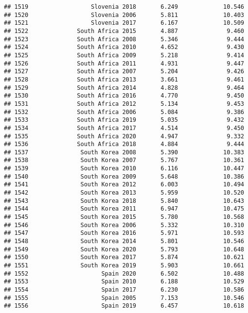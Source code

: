 \documentclass[
]{article}
\begin{document}
\begin{verbatim}
## 1519                  Slovenia 2018       6.249             10.546
## 1520                  Slovenia 2006       5.811             10.403
## 1521                  Slovenia 2017       6.167             10.509
## 1522              South Africa 2015       4.887              9.460
## 1523              South Africa 2008       5.346              9.444
## 1524              South Africa 2010       4.652              9.430
## 1525              South Africa 2009       5.218              9.414
## 1526              South Africa 2011       4.931              9.447
## 1527              South Africa 2007       5.204              9.426
## 1528              South Africa 2013       3.661              9.461
## 1529              South Africa 2014       4.828              9.464
## 1530              South Africa 2016       4.770              9.450
## 1531              South Africa 2012       5.134              9.453
## 1532              South Africa 2006       5.084              9.386
## 1533              South Africa 2019       5.035              9.432
## 1534              South Africa 2017       4.514              9.450
## 1535              South Africa 2020       4.947              9.332
## 1536              South Africa 2018       4.884              9.444
## 1537               South Korea 2008       5.390             10.383
## 1538               South Korea 2007       5.767             10.361
## 1539               South Korea 2010       6.116             10.447
## 1540               South Korea 2009       5.648             10.386
## 1541               South Korea 2012       6.003             10.494
## 1542               South Korea 2013       5.959             10.520
## 1543               South Korea 2018       5.840             10.643
## 1544               South Korea 2011       6.947             10.475
## 1545               South Korea 2015       5.780             10.568
## 1546               South Korea 2006       5.332             10.310
## 1547               South Korea 2016       5.971             10.593
## 1548               South Korea 2014       5.801             10.546
## 1549               South Korea 2020       5.793             10.648
## 1550               South Korea 2017       5.874             10.621
## 1551               South Korea 2019       5.903             10.661
## 1552                     Spain 2020       6.502             10.488
## 1553                     Spain 2010       6.188             10.529
## 1554                     Spain 2017       6.230             10.586
## 1555                     Spain 2005       7.153             10.546
## 1556                     Spain 2019       6.457             10.618

\end{verbatim}
\end{document}
